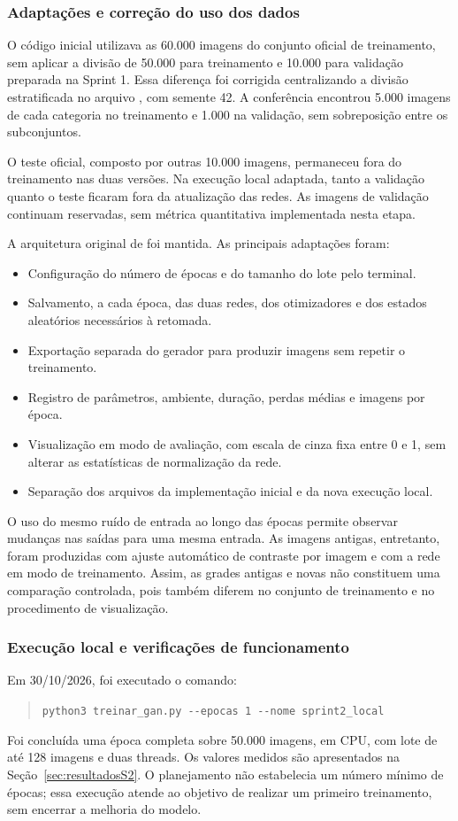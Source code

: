 \documentclass[12pt,a4paper]{article}
\begin{document}
\subsubsection{Adaptações e correção do uso dos dados}
\label{sec:ajustesS2}
O código inicial utilizava as 60.000 imagens do conjunto oficial de treinamento, sem aplicar a divisão de 50.000 para treinamento e 10.000 para validação preparada na Sprint 1. Essa diferença foi corrigida centralizando a divisão estratificada no arquivo , com semente 42. A conferência encontrou 5.000 imagens de cada categoria no treinamento e 1.000 na validação, sem sobreposição entre os subconjuntos.

O teste oficial, composto por outras 10.000 imagens, permaneceu fora do treinamento nas duas versões. Na execução local adaptada, tanto a validação quanto o teste ficaram fora da atualização das redes. As imagens de validação continuam reservadas, sem métrica quantitativa implementada nesta etapa.

A arquitetura original de  foi mantida. As principais adaptações foram:
\begin{itemize}
\item Configuração do número de épocas e do tamanho do lote pelo terminal.
\item Salvamento, a cada época, das duas redes, dos otimizadores e dos estados aleatórios necessários à retomada.
\item Exportação separada do gerador para produzir imagens sem repetir o treinamento.
\item Registro de parâmetros, ambiente, duração, perdas médias e imagens por época.
\item Visualização em modo de avaliação, com escala de cinza fixa entre 0 e 1, sem alterar as estatísticas de normalização da rede.
\item Separação dos arquivos da implementação inicial e da nova execução local.
\end{itemize}

O uso do mesmo ruído de entrada ao longo das épocas permite observar mudanças nas saídas para uma mesma entrada. As imagens antigas, entretanto, foram produzidas com ajuste automático de contraste por imagem e com a rede em modo de treinamento. Assim, as grades antigas e novas não constituem uma comparação controlada, pois também diferem no conjunto de treinamento e no procedimento de visualização.

\subsubsection{Execução local e verificações de funcionamento}
Em 30/10/2026, foi executado o comando:
\begin{quote}
\small\verb|python3 treinar_gan.py --epocas 1 --nome sprint2_local|
\end{quote}
Foi concluída uma época completa sobre 50.000 imagens, em CPU, com lote de até 128 imagens e duas threads. Os valores medidos são apresentados na Seção~\ref{sec:resultadosS2}. O planejamento não estabelecia um número mínimo de épocas; essa execução atende ao objetivo de realizar um primeiro treinamento, sem encerrar a melhoria do modelo.
\end{document}
